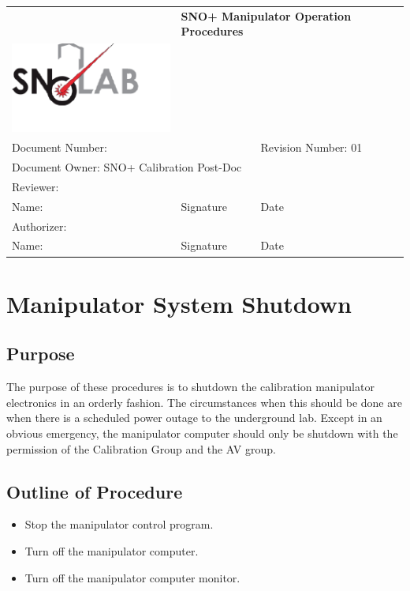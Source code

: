 \documentclass[11pt]{article}
\begin{document}
\begin{tabular}{||l|l|l||}
\hline\hline
& \multicolumn{2}{p{8cm}||}{\bf SNO+ Manipulator Operation Procedures} \\
\includegraphics[width=6cm]{../snolablogo.pdf} & \multicolumn{2}{p{8cm}||}{} \\
\hline
\multicolumn{2}{||p{8.5cm}|}{Document Number:} & Revision Number: 01\\
\hline
\multicolumn{3}{||l||}{Document Owner: SNO+ Calibration Post-Doc} \\
\hline
\multicolumn{3}{||l||}{Reviewer:}\\
\hline
Name: & Signature & Date \\
\hline
\multicolumn{3}{||l||}{Authorizer:}\\
\hline
Name: & Signature & Date \\
\hline\hline
\end{tabular}
\thispagestyle{empty}

\section{Manipulator System Shutdown}

\subsection{Purpose}
The purpose of these procedures is to shutdown the calibration manipulator electronics in an orderly fashion. The circumstances when this should be done are when there is a scheduled power outage to the underground lab. Except in an obvious emergency, the manipulator computer should only be shutdown with the permission of the Calibration Group and the AV group.

\subsection{Outline of Procedure}
\begin{itemize}
\item Stop the manipulator control program.
\item Turn off the manipulator computer.
\item Turn off the manipulator computer monitor.
\end{itemize}
\end{document}
